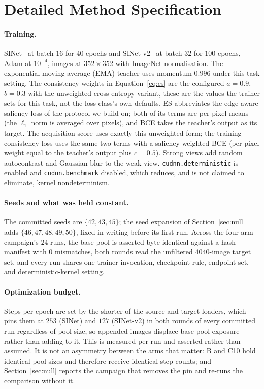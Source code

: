 \documentclass{article}
\begin{document}
\section{Detailed Method Specification}
\label{app:method}

\paragraph{Training.} SINet~\citep{fan2020sinet} at batch $16$ for $40$ epochs and
SINet-v2~\citep{fan2022concealed} at batch $32$ for $100$ epochs, Adam at $10^{-4}$, images at
$352 \times 352$ with ImageNet normalisation. The exponential-moving-average (EMA) teacher uses momentum $0.996$ under this task
setting. The consistency weights in Equation~\ref{eq:es} are the configured $a = 0.9$, $b = 0.3$
with the unweighted cross-entropy variant, these are the values the trainer sets for this task,
not the loss class's own defaults. ES abbreviates the edge-aware saliency loss of the protocol we
build on; both of its terms are per-pixel means (the $\ell_1$ norm is averaged over pixels), and BCE
takes the teacher's output as its target. The acquisition score uses exactly this unweighted form; the training consistency loss uses the same two terms with a saliency-weighted BCE (per-pixel weight
equal to the teacher's output plus $c = 0.5$). Strong views add random autocontrast and Gaussian blur to the
weak view. \texttt{cudnn.deterministic} is enabled and \texttt{cudnn.benchmark} disabled, which
reduces, and is not claimed to eliminate, kernel nondeterminism.

\paragraph{Seeds and what was held constant.} The committed seeds are $\{42, 43, 45\}$; the seed
expansion of Section~\ref{sec:null} adds $\{46, 47, 48, 49, 50\}$, fixed in writing before its first
run. Across the four-arm campaign's $24$ runs, the base pool is asserted byte-identical against a
hash manifest with $0$ mismatches, both rounds read the unfiltered $4040$-image target set, and every run shares one trainer invocation, checkpoint rule, endpoint set, and deterministic-kernel
setting.

\paragraph{Optimization budget.} Steps per epoch are set by the shorter of the source and target
loaders, which pins them at $253$ (SINet) and $127$ (SINet-v2) in both rounds of every committed run
regardless of pool size, so appended images displace base-pool exposure rather than adding to it.
This is measured per run and asserted rather than assumed. It is not an asymmetry between the arms
that matter: B and C10 hold identical pool sizes and therefore receive identical step counts;
and Section~\ref{sec:null} reports the campaign that removes the pin and re-runs the comparison
without it.
\end{document}
